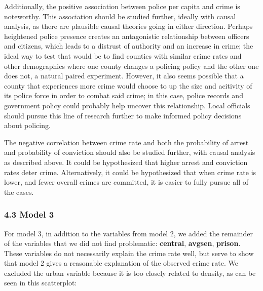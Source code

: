 \documentclass[]{article}
\newenvironment{Shaded}{\begin{snugshade}}{\end{snugshade}}
\newcommand{\KeywordTok}[1]{\textcolor[rgb]{0.13,0.29,0.53}{\textbf{#1}}}
\newcommand{\DataTypeTok}[1]{\textcolor[rgb]{0.13,0.29,0.53}{#1}}
\newcommand{\StringTok}[1]{\textcolor[rgb]{0.31,0.60,0.02}{#1}}
\newcommand{\OperatorTok}[1]{\textcolor[rgb]{0.81,0.36,0.00}{\textbf{#1}}}
\newcommand{\NormalTok}[1]{#1}
\begin{document}
Additionally, the positive association between police per capita and
crime is noteworthy. This association should be studied further, ideally
with causal analysis, as there are plausible causal theories going in
either direction. Perhaps heightened police presence creates an
antagonistic relationship between officers and citizens, which leads to
a distrust of authority and an increase in crime; the ideal way to test
that would be to find counties with similar crime rates and other
demographics where one county changes a policing policy and the other
one does not, a natural paired experiment. However, it also seems
possible that a county that experiences more crime would choose to up
the size and acitivity of its police force in order to combat said
crime; in this case, police records and government policy could probably
help uncover this relationship. Local officials should pursue this line
of research further to make informed policy decisions about policing.

The negative correlation between crime rate and both the probability of
arrest and probability of conviction should also be studied further,
with causal analysis as described above. It could be hypothesized that
higher arrest and conviction rates deter crime. Alternatively, it could
be hypothesized that when crime rate is lower, and fewer overall crimes
are committed, it is easier to fully pursue all of the cases.

\subsubsection{4.3 Model 3}\label{model-3}

For model 3, in addition to the variables from model 2, we added the
remainder of the variables that we did not find problematic:
\textbf{central}, \textbf{avgsen}, \textbf{prison}. These variables do
not necessarily explain the crime rate well, but serve to show that
model 2 gives a reasonable explanation of the observed crime rate. We
excluded the urban variable because it is too closely related to
density, as can be seen in this scatterplot:

\begin{Shaded}
\end{Shaded}
\end{document}
